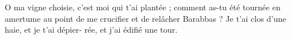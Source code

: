O ma vigne choisie, c’est moi qui t’ai plantée ; comment as-tu été tournée en amertume au point de me crucifier et de relâcher Barabbas ?
\versseparator
Je t’ai clos d’une haie, et je t’ai dépier- rée, et j’ai édifié une tour.
